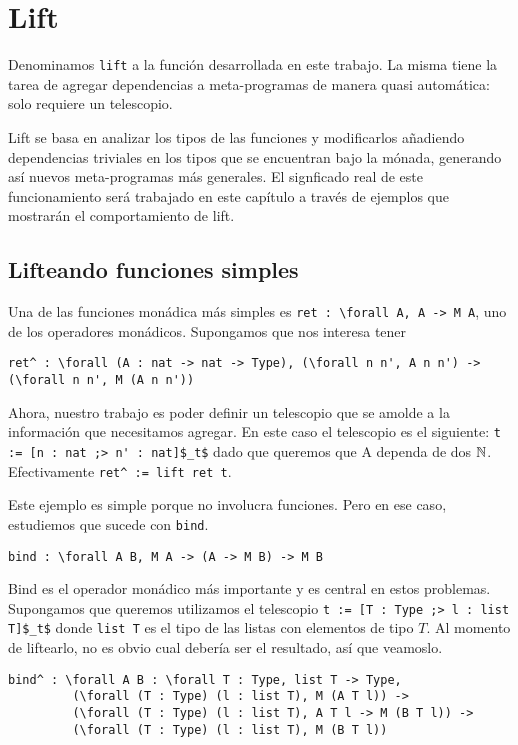 \chapter{Lift}\label{ch:lift}

Denominamos \lstinline{lift} a la función desarrollada en este trabajo.
La misma tiene la tarea de agregar dependencias a meta-programas de manera quasi automática: solo requiere un telescopio.

Lift se basa en analizar los tipos de las funciones y modificarlos añadiendo dependencias triviales en los tipos que se encuentran bajo la mónada, generando así nuevos meta-programas más generales.
El signficado real de este funcionamiento será trabajado en este capítulo a través de ejemplos que mostrarán el comportamiento de lift.

\section{Lifteando funciones simples}

Una de las funciones monádica más simples es \lstinline{ret : \forall A, A -> M A}, uno de los operadores monádicos.
Supongamos que nos interesa tener
\begin{lstlisting}
ret^ : \forall (A : nat -> nat -> Type), (\forall n n', A n n') -> (\forall n n', M (A n n'))
\end{lstlisting}

Ahora, nuestro trabajo es poder definir un telescopio que se amolde a la información que necesitamos agregar.
En este caso el telescopio es el siguiente: \lstinline{t := [n : nat ;> n' : nat]$_t$} dado que queremos que \lstinline{}{A} dependa de dos $\mathbb{N}$. Efectivamente \lstinline{ret^ := lift ret t}.

Este ejemplo es simple porque no involucra funciones. Pero en ese caso, estudiemos que sucede con \lstinline{bind}.
\begin{lstlisting}
bind : \forall A B, M A -> (A -> M B) -> M B
\end{lstlisting}

Bind es el operador monádico más importante y es central en estos problemas.
Supongamos que queremos utilizamos el telescopio \lstinline{t := [T : Type ;> l : list T]$_t$} donde \lstinline{list T} es el tipo de las listas con elementos de tipo $T$.
Al momento de liftearlo, no es obvio cual debería ser el resultado, así que veamoslo.

\begin{lstlisting}
bind^ : \forall A B : \forall T : Type, list T -> Type,
         (\forall (T : Type) (l : list T), M (A T l)) ->
         (\forall (T : Type) (l : list T), A T l -> M (B T l)) ->
         (\forall (T : Type) (l : list T), M (B T l))
\end{lstlisting}

